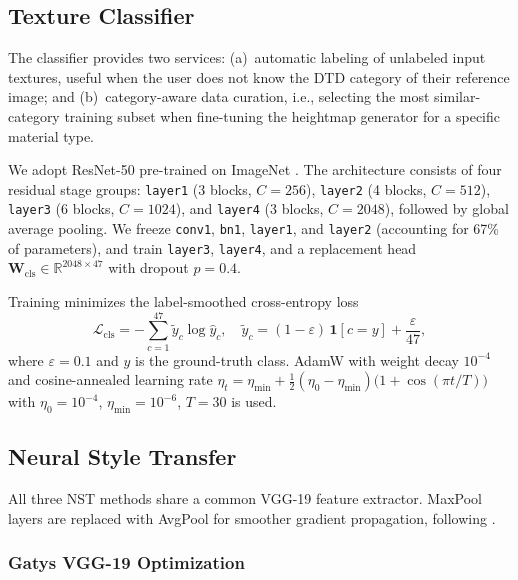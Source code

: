 \documentclass[conference]{IEEEtran}
\newcommand{\R}{\mathbb{R}}
\begin{document}
\subsection{Texture Classifier}
\label{sec:classifier}

The classifier provides two services: (a)~automatic labeling of unlabeled
input textures, useful when the user does not know the DTD category of their
reference image; and (b)~category-aware data curation, i.e., selecting the
most similar-category training subset when fine-tuning the heightmap generator
for a specific material type.

We adopt ResNet-50 \cite{b2} pre-trained on ImageNet \cite{b14}. The
architecture consists of four residual stage groups: \texttt{layer1}
(3 blocks, $C=256$), \texttt{layer2} (4 blocks, $C=512$), \texttt{layer3}
(6 blocks, $C=1024$), and \texttt{layer4} (3 blocks, $C=2048$), followed by
global average pooling. We freeze \texttt{conv1}, \texttt{bn1}, \texttt{layer1},
and \texttt{layer2} (accounting for 67\% of parameters), and train
\texttt{layer3}, \texttt{layer4}, and a replacement head
$\mathbf{W}_{\text{cls}} \in \R^{2048 \times 47}$ with dropout $p=0.4$.

Training minimizes the label-smoothed cross-entropy loss
\begin{equation}
  \mathcal{L}_{\text{cls}} =
    -\sum_{c=1}^{47} \tilde{y}_c \log \hat{y}_c,
  \quad
  \tilde{y}_c = (1-\varepsilon)\,\mathbf{1}[c=y] + \frac{\varepsilon}{47},
  \label{eq:labelsmooth}
\end{equation}
where $\varepsilon=0.1$ and $y$ is the ground-truth class. AdamW with
weight decay $10^{-4}$ and cosine-annealed learning rate
$\eta_t = \eta_{\min} + \tfrac{1}{2}(\eta_0 - \eta_{\min})\bigl(1 +
\cos(\pi t/T)\bigr)$ with $\eta_0=10^{-4}$, $\eta_{\min}=10^{-6}$,
$T=30$ is used.

\subsection{Neural Style Transfer}
\label{sec:nst}

All three NST methods share a common VGG-19 feature extractor. MaxPool layers
are replaced with AvgPool for smoother gradient propagation, following
\cite{b4}.

\subsubsection{Gatys VGG-19 Optimization}
\end{document}
